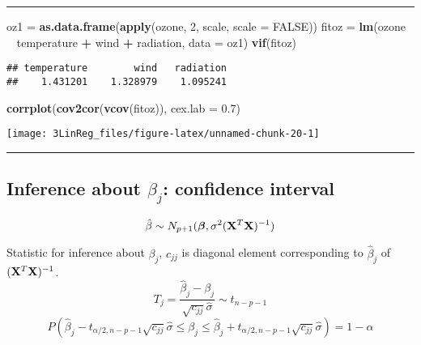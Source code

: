 \documentclass[]{article}
\newenvironment{Shaded}{\begin{snugshade}}{\end{snugshade}}
\newcommand{\DataTypeTok}[1]{\textcolor[rgb]{0.13,0.29,0.53}{#1}}
\newcommand{\DecValTok}[1]{\textcolor[rgb]{0.00,0.00,0.81}{#1}}
\newcommand{\FloatTok}[1]{\textcolor[rgb]{0.00,0.00,0.81}{#1}}
\newcommand{\KeywordTok}[1]{\textcolor[rgb]{0.13,0.29,0.53}{\textbf{#1}}}
\newcommand{\NormalTok}[1]{#1}
\newcommand{\OperatorTok}[1]{\textcolor[rgb]{0.81,0.36,0.00}{\textbf{#1}}}
\newcommand{\OtherTok}[1]{\textcolor[rgb]{0.56,0.35,0.01}{#1}}
\newcommand{\StringTok}[1]{\textcolor[rgb]{0.31,0.60,0.02}{#1}}
\begin{document}
\begin{center}\rule{0.5\linewidth}{\linethickness}\end{center}

\small

\begin{Shaded}
\begin{Highlighting}[]
\NormalTok{oz1 =}\StringTok{ }\KeywordTok{as.data.frame}\NormalTok{(}\KeywordTok{apply}\NormalTok{(ozone, }\DecValTok{2}\NormalTok{, scale, }\DataTypeTok{scale =} \OtherTok{FALSE}\NormalTok{))}
\NormalTok{fitoz =}\StringTok{ }\KeywordTok{lm}\NormalTok{(ozone }\OperatorTok{~}\StringTok{ }\NormalTok{temperature }\OperatorTok{+}\StringTok{ }\NormalTok{wind }\OperatorTok{+}\StringTok{ }\NormalTok{radiation, }\DataTypeTok{data =}\NormalTok{ oz1)}
\KeywordTok{vif}\NormalTok{(fitoz)}
\end{Highlighting}
\end{Shaded}

\begin{verbatim}
## temperature        wind   radiation 
##    1.431201    1.328979    1.095241
\end{verbatim}

\begin{Shaded}
\begin{Highlighting}[]
\KeywordTok{corrplot}\NormalTok{(}\KeywordTok{cov2cor}\NormalTok{(}\KeywordTok{vcov}\NormalTok{(fitoz)), }\DataTypeTok{cex.lab =} \FloatTok{0.7}\NormalTok{)}
\end{Highlighting}
\end{Shaded}

\texttt{[image: 3LinReg\_files/figure-latex/unnamed-chunk-20-1]}
\normalsize

\begin{center}\rule{0.5\linewidth}{\linethickness}\end{center}

\hypertarget{inference-about-beta_j-confidence-interval}{%
\subsection{\texorpdfstring{Inference about \(\beta_j\): confidence
interval}{Inference about \textbackslash{}beta\_j: confidence interval}}\label{inference-about-beta_j-confidence-interval}}

\[\hat{\beta}\sim N_{p+1}(\boldsymbol{\beta},\sigma^2({\bf X}^T{\bf X})^{-1})\]

Statistic for inference about \(\beta_j\), \(c_{jj}\) is diagonal
element corresponding to \(\hat{\beta}_j\) of
\(({\bf X}^T{\bf X})^{-1}\).
\[ T_j=\frac{\hat{\beta}_j-\beta_j}{\sqrt{c_{jj}}\hat{\sigma}}\sim t_{n-p-1}\]
\[ P(\hat{\beta}_j-t_{\alpha/2,n-p-1}\sqrt{c_{jj}}\hat{\sigma}
\le \beta_j \le \hat{\beta}_j+t_{\alpha/2,n-p-1}\sqrt{c_{jj}}\hat{\sigma})=1-\alpha\]
\end{document}
